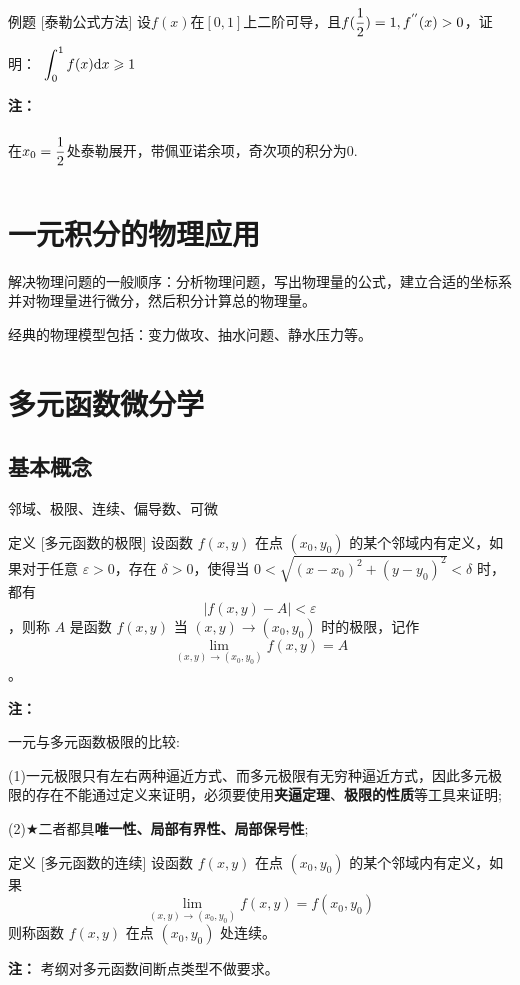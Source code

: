 \documentclass[a4paper,12pt,oneside,fontset=none]{ctexbook}
\renewcommand{\geq}{\geqslant}
\let\olddfrac\dfrac
\renewcommand{\dfrac}[2]{
    \olddfrac{#1\vrule width 0pt height 1.15em depth 0em}{#2\vrule width 0pt height 0em depth 0.6em}
}
\let\oldlim\lim
\renewcommand{\lim}{\displaystyle\oldlim}
\let\oldint\int
\renewcommand{\int}{\displaystyle{\vrule width 0pt height 0em depth 0em}\oldint}
\newcounter{definition}[chapter]
\newenvironment{definition}[1][]{\begin{defBox}{定义}{#1}}{\end{defBox}}
\newcounter{example}[chapter]
\newenvironment{example}[1][]{\begin{exBox}{例题}{#1}}{\end{exBox}}
\newenvironment{note}{
    \par\vspace{0.5em}\noindent
    \textbf{\color{NoteColor} 注：}
}{
    \par\vspace{0.5em}
}
\numberwithin{equation}{chapter}
\begin{document}
\begin{example}
    [泰勒公式方法]
    设$f(x)$在$[0,1]$上二阶可导，且$f(\dfrac{1}{2})=1,f^{''}(x) > 0$，证明：
    $\int_{0}^{1}f(x)\mathrm{d}x\geq 1$
\end{example}
\begin{note}
    在$x_0=\dfrac{1}{2}$处泰勒展开，带佩亚诺余项，奇次项的积分为0.
\end{note}



\chapter{一元积分的物理应用}
解决物理问题的一般顺序：分析物理问题，写出物理量的公式，建立合适的坐标系并对物理量进行微分，然后积分计算总的物理量。

经典的物理模型包括：变力做攻、抽水问题、静水压力等。

\chapter{多元函数微分学}
\section{基本概念}
邻域、极限、连续、偏导数、可微

\begin{definition}
    [多元函数的极限]
    设函数 $f(x,y)$ 在点 $(x_0,y_0)$ 的某个邻域内有定义，如果对于任意 $\varepsilon > 0$，存在 $\delta > 0$，使得当 $0 < \sqrt{(x-x_0)^2 + (y-y_0)^2} < \delta$ 时，都有 $$|f(x,y) - A| < \varepsilon$$，则称 $A$ 是函数 $f(x,y)$ 当 $(x,y) \to (x_0,y_0)$ 时的极限，记作 $$\lim_{(x,y) \to (x_0,y_0)} f(x,y) = A$$。
\end{definition}
\begin{note}
    一元与多元函数极限的比较:
    
    (1)一元极限只有左右两种逼近方式、而多元极限有无穷种逼近方式，因此多元极限的存在不能通过定义来证明，必须要使用\textbf{夹逼定理}、\textbf{极限的性质}等工具来证明;
    
    (2)$\bigstar$二者都具\textbf{唯一性、局部有界性、局部保号性};
\end{note}

\begin{definition}
    [多元函数的连续]
    设函数 $f(x,y)$ 在点 $(x_0,y_0)$ 的某个邻域内有定义，如果 $$\lim_{(x,y) \to (x_0,y_0)} f(x,y) = f(x_0,y_0)$$则称函数 $f(x,y)$ 在点 $(x_0,y_0)$ 处连续。
\end{definition}
\begin{note}考纲对多元函数间断点类型不做要求。\end{note}
\end{document}
